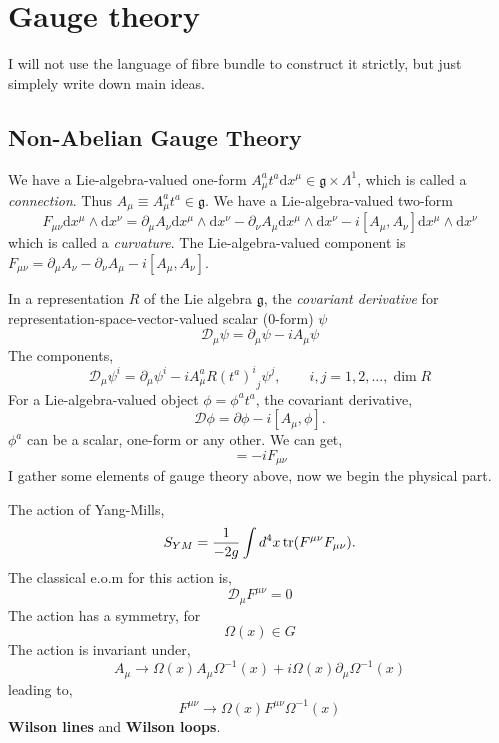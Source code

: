 \documentclass[a4paper,12pt]{article}
\begin{document}
\section{Gauge theory}
I will not use the language of fibre bundle to construct it strictly, but just simplely write down main ideas.
\subsection{Non-Abelian Gauge Theory}
We have a Lie-algebra-valued one-form $A_\mu^a t^a \mathrm{d}x^\mu\in\mathfrak{g}\times \Lambda^1$, which is called a \textit{connection}. Thus $A_\mu\equiv A_\mu^a t^a\in \mathfrak{g}$. 
We have a Lie-algebra-valued two-form 
\begin{equation}
    F_{\mu \nu}\mathrm{d}x^\mu\wedge \mathrm{d}x^\nu=\partial_\mu A_\nu \mathrm{d}x^\mu\wedge \mathrm{d}x^\nu-\partial_\nu A_\mu \mathrm{d}x^\mu\wedge \mathrm{d}x^\nu-i[A_\mu,A_\nu]\mathrm{d}x^\mu\wedge \mathrm{d}x^\nu
\end{equation}
which is called a \textit{curvature}. 
The Lie-algebra-valued component is $F_{\mu \nu}=\partial_\mu A_\nu-\partial_\nu A_\mu-i[A_\mu,A_\nu]$.\par
In a representation $R$  of the Lie algebra $\mathfrak{g}$, the \textit{covariant derivative} for representation-space-vector-valued scalar (0-form) $\psi$ 
\begin{equation}
    \mathcal{D}_\mu \psi=\partial_\mu \psi-iA_\mu \psi
\end{equation}
The components,
\begin{equation}
    \mathcal{D}_\mu \psi^i=\partial_\mu \psi^i-iA_\mu^a {R(t^a)^i}_j \psi^j,\qquad i,j=1,2,\dots,\dim R
\end{equation}
For a Lie-algebra-valued object $\phi=\phi^a t^a$, the covariant derivative,
\begin{equation}
    \mathcal{D}\phi=\partial \phi-i[A_\mu,\phi].
\end{equation}
$\phi^a$ can be a scalar, one-form or any other. We can get,
\begin{equation}
    [\mathcal{D}_\mu,\mathcal{D}_\nu]=-iF_{\mu \nu}
\end{equation}
I gather some elements of gauge theory above, now we begin the physical part.\par
The action of Yang-Mills,
\begin{equation}
    S_{YM}=\frac{1}{-2g}\int d^4 x\tr(F^{\mu \nu}F_{\mu \nu}).
\end{equation}
The classical e.o.m for this action is,
\begin{equation}
    \mathcal{D}_\mu F^{\mu \nu }=0
\end{equation}
The action has a symmetry, for
\begin{equation}
    \Omega(x)\in G
\end{equation}
The action is invariant under,
\begin{equation}
    A_\mu\to \Omega(x)A_\mu \Omega^{-1}(x)+i \Omega(x)\partial_\mu \Omega^{-1}(x)    
\end{equation} 
leading to,
\begin{equation}
    F^{\mu \nu}\to \Omega(x)F^{\mu \nu}\Omega^{-1}(x)
\end{equation}
\textbf{Wilson lines} and \textbf{Wilson loops}.
\end{document}

